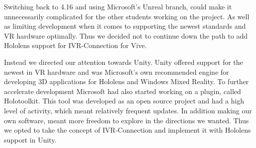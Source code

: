         Switching back to 4.16 and using Microsoft's Unreal branch, could make it unnecessarily complicated for the other students working on the project. As well as limiting development when it comes to supporting the newest standards and VR hardware optimally. Thus we decided not to continue down the path to add Hololens support for IVR-Connection for Vive.
        
        Instead we directed our attention towards Unity. Unity offered support for the newest in VR hardware and was Microsoft's own recommended engine for developing 3D applications for Hololens and Windows Mixed Reality. To further accelerate development Microsoft had also started working on a plugin, called Holotoolkit. This tool was developed as an open source project and had a high level of activity, which meant relatively frequent updates. In addition making our own software, meant more freedom to explore in the directions we wanted. Thus we opted to take the concept of IVR-Connection and implement it with Hololens support in Unity. %